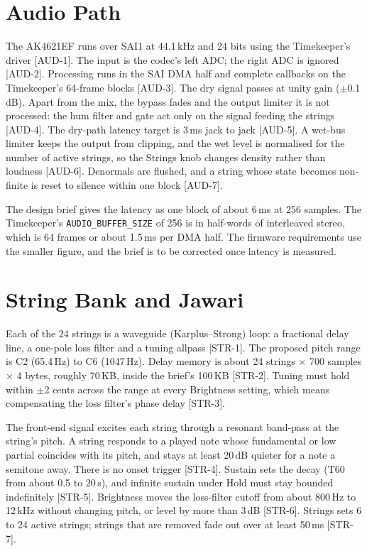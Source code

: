 \section{Audio Path}
The AK4621EF runs over SAI1 at 44.1\,kHz and 24 bits using the Timekeeper's driver [AUD-1]. The input is the codec's left ADC; the right ADC is ignored [AUD-2]. Processing runs in the SAI DMA half and complete callbacks on the Timekeeper's 64-frame blocks [AUD-3]. The dry signal passes at unity gain ($\pm$0.1\,dB). Apart from the mix, the bypass fades and the output limiter it is not processed: the hum filter and gate act only on the signal feeding the strings [AUD-4]. The dry-path latency target is 3\,ms jack to jack [AUD-5]. A wet-bus limiter keeps the output from clipping, and the wet level is normalised for the number of active strings, so the Strings knob changes density rather than loudness [AUD-6]. Denormals are flushed, and a string whose state becomes non-finite is reset to silence within one block [AUD-7].

The design brief gives the latency as one block of about 6\,ms at 256 samples. The Timekeeper's \texttt{AUDIO\_BUFFER\_SIZE} of 256 is in half-words of interleaved stereo, which is 64 frames or about 1.5\,ms per DMA half. The firmware requirements use the smaller figure, and the brief is to be corrected once latency is measured.

\section{String Bank and Jawari}
Each of the 24 strings is a waveguide (Karplus--Strong) loop: a fractional delay line, a one-pole loss filter and a tuning allpass [STR-1]. The proposed pitch range is C2 (65.4\,Hz) to C6 (1047\,Hz). Delay memory is about 24 strings $\times$ 700 samples $\times$ 4 bytes, roughly 70\,KB, inside the brief's 100\,KB [STR-2]. Tuning must hold within $\pm$2 cents across the range at every Brightness setting, which means compensating the loss filter's phase delay [STR-3].

The front-end signal excites each string through a resonant band-pass at the string's pitch. A string responds to a played note whose fundamental or low partial coincides with its pitch, and stays at least 20\,dB quieter for a note a semitone away. There is no onset trigger [STR-4]. Sustain sets the decay (T60 from about 0.5 to 20\,s), and infinite sustain under Hold must stay bounded indefinitely [STR-5]. Brightness moves the loss-filter cutoff from about 800\,Hz to 12\,kHz without changing pitch, or level by more than 3\,dB [STR-6]. Strings sets 6 to 24 active strings; strings that are removed fade out over at least 50\,ms [STR-7].


